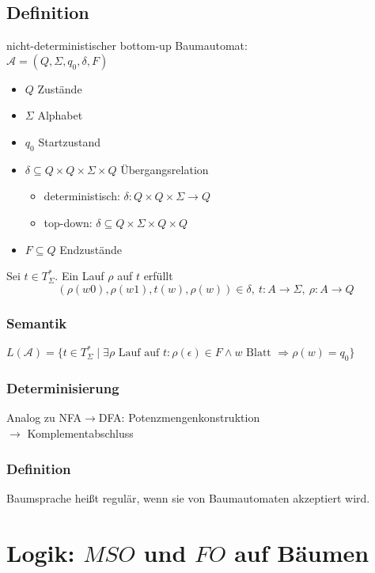     \subsection{Definition}
        nicht-deterministischer bottom-up Baumautomat:\\
        $\mathcal{A}=(Q,\Sigma,q_0,\delta,F)$
        \begin{itemize}
            \item $Q$ Zustände
            \item $\Sigma$ Alphabet
            \item $q_0$ Startzustand
            \item $\delta\subseteq Q\times Q\times \Sigma\times Q$ Übergangsrelation
            \begin{itemize}
                \item deterministisch: $\delta: Q\times Q\times \Sigma\rightarrow Q$
                \item top-down: $\delta\subseteq Q\times\Sigma\times Q\times Q$
            \end{itemize}
            \item $F\subseteq Q$ Endzustände
        \end{itemize}
        Sei $t\in T_\Sigma^*$. Ein Lauf $\rho$ auf $t$ erfüllt $$\left(\rho(w0),\rho(w1),t(w),\rho(w)\right)\in\delta,\ t: A\rightarrow\Sigma,\ \rho:A\rightarrow Q$$
        \subsubsection{Semantik}
            $L(\mathcal{A})=\{t\in T_\Sigma^*\mid\exists\rho\text{ Lauf auf }t:\rho(\epsilon)\in F\wedge w\text{ Blatt }\Rightarrow \rho(w)=q_0\}$
        \subsubsection{Determinisierung}
            Analog zu NFA$\rightarrow$DFA: Potenzmengenkonstruktion\\
            $\rightarrow$ Komplementabschluss
        \subsubsection{Definition}
            Baumsprache heißt regulär, wenn sie von Baumautomaten akzeptiert wird.
\section{Logik: $MSO$ und $FO$ auf Bäumen}
